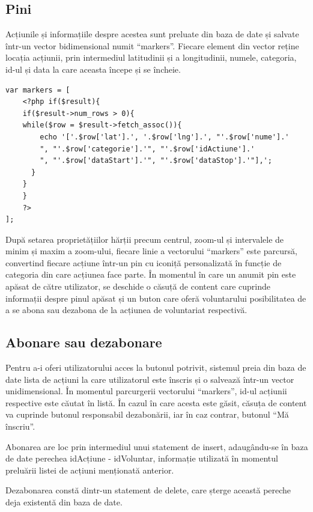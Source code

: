 \documentclass[12pt,a4paper]{report}
\begin{document}
\subsection{Pini}
\par
Acțiunile și informațiile despre acestea sunt preluate din baza de date și salvate într-un vector bidimensional numit “markers”. Fiecare element din vector reține locația acțiunii, prin intermediul latitudinii și a longitudinii, numele, categoria, id-ul și data la care aceasta începe și se încheie.

\begin{lstlisting}[basicstyle=\small, caption=Cod PHP inclus în Javascript pentru popularea vectorului “markers”]
var markers = [
    <?php if($result){
    if($result->num_rows > 0){
    while($row = $result->fetch_assoc()){
        echo '['.$row['lat'].', '.$row['lng'].', "'.$row['nume'].'
        ", "'.$row['categorie'].'", "'.$row['idActiune'].'
        ", "'.$row['dataStart'].'", "'.$row['dataStop'].'"],';
      }
    }
    }
    ?>
];
\end{lstlisting}

\par
După setarea proprietățiilor hărții precum centrul, zoom-ul și intervalele de minim și maxim a zoom-ului, fiecare linie a vectorului “markers” este parcursă, convertind fiecare acțiune într-un pin cu iconiță personalizată în funcție de categoria din care acțiunea face parte. În momentul în care un anumit pin este apăsat de către utilizator, se deschide o căsuță de content care cuprinde informații despre pinul apăsat și un buton care oferă voluntarului posibilitatea de a se abona sau dezabona de la acțiunea de voluntariat respectivă.

\newpage
\subsection{Abonare sau dezabonare}
\par
Pentru a-i oferi utilizatorului acces la butonul potrivit, sistemul preia din baza de date lista de acțiuni la care utilizatorul este înscris și o salvează într-un vector unidimensional. În momentul parcurgerii vectorului “markers”, id-ul acțiunii respective este căutat în listă. În cazul în care acesta este găsit, căsuța de content va cuprinde butonul responsabil dezabonării, iar în caz contrar, butonul  “Mă înscriu”.
\\
\par
Abonarea are loc prin intermediul unui statement de insert, adaugându-se în baza de date perechea idAcțiune - idVoluntar, informație utilizată în momentul preluării listei de acțiuni menționată anterior.
\\
\par
Dezabonarea constă dintr-un statement de delete, care șterge această pereche deja existentă din baza de date.
\end{document}
